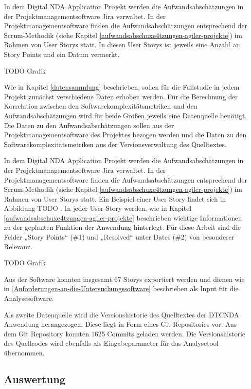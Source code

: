 In dem Digital NDA Application Projekt werden die Aufwandsabschätzungen
in der Projektmanagementsoftware Jira verwaltet. In der
Projektmanagementsoftware finden die Aufwandsabschätzungen entsprechend
der Scrum-Methodik (siehe Kapitel \ref{aufwandsabschuxe4tzungen-agiler-projekte}) im Rahmen von User Storys statt.
In diesen User Storys ist jeweils eine Anzahl an Story Points und ein Datum vermerkt.

TODO Grafik

Wie in Kapitel \ref{datensammlung} beschrieben, sollen für die Fallstudie in jedem
Projekt zunächst verschiedene Daten erhoben werden. Für die Berechnung
der Korrelation zwischen den Softwarekomplexitätsmetriken und den
Aufwandsabschätzungen wird für beide Größen jeweils eine Datenquelle
benötigt. Die Daten zu den Aufwandsabschätzungen sollen aus der
Projektmanagementsoftware des Projektes bezogen werden und die Daten zu
den Softwarekomplexitätsmetriken aus der Versionsverwaltung des
Quelltextes.

In dem Digital NDA Application Projekt werden die Aufwandsabschätzungen
in der Projektmanagementsoftware Jira verwaltet. In der
Projektmanagementsoftware finden die Aufwandsabschätzungen entsprechend
der Scrum-Methodik (siehe Kapitel \ref{aufwandsabschuxe4tzungen-agiler-projekte}) im Rahmen von User Storys statt.
Ein Beispiel einer User Story findet sich in Abbildung TODO . In
jeder User Story werden, wie in Kapitel \ref{aufwandsabschuxe4tzungen-agiler-projekte} beschrieben wichtige
Informationen zu der geplanten Funktion der Anwendung hinterlegt. Für
diese Arbeit sind die Felder „Story Points`` (\#1) und „Resolved`` unter
Dates (\#2) von besonderer Relevanz.

TODO Grafik

Aus der Software konnten insgesamt 67 Storys exportiert werden und
dienen wie in \ref{Anforderungen-an-die-Untersuchungssoftware} beschrieben als Input für die Analysesoftware.

Als zweite Datenquelle wird die Versionshistorie des Quelltextes der
DTCNDA Anwendung herangezogen. Diese liegt in Form eines Git
Repositories vor. Aus dem Git Repository konnten 1625 Commits geladen
werden. Die Versionshistorie des Quellcodes wird ebenfalls als
Eingabeparameter für das Analysetool übernommen.

\subsection{Auswertung}\label{nda-Auswertung}

